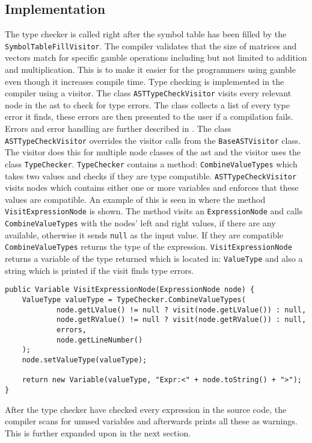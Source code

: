\subsection*{Implementation}
The type checker is called right after the symbol table has been filled by the \texttt{SymbolTableFillVisitor}.
The compiler validates that the size of matrices and vectors match for specific \gls{gamble} operations including but not limited to addition and multiplication.
This is to make it easier for the programmers using \gls{gamble} even though it increases compile time. 
Type checking is implemented in the compiler using a visitor. 
The class \texttt{ASTTypeCheckVisitor} visits every relevant node in the \acrshort{ast} to check for type errors.
The class collects a list of every type error it finds, these errors are then presented to the user if a compilation fails.
Errors and error handling are further described in .
The class \texttt{ASTTypeCheckVisitor} overrides the visitor calls from the \texttt{BaseASTVisitor} class.
The visitor does this for multiple node classes of the \acrshort{ast} and the visitor uses the class \texttt{TypeChecker}.
\texttt{TypeChecker} contains a method: \texttt{CombineValueTypes} which takes two values and checks if they are type compatible.
\texttt{ASTTypeCheckVisitor} visits nodes which contains either one or more variables and enforces that these values are compatible.
An example of this is seen in  where the method \texttt{VisitExpressionNode} is shown.
The method visits an \texttt{ExpressionNode} and calls \texttt{CombineValueTypes} with the nodes' left and right values, if there are any available, otherwise it sends \texttt{null} as the input value. 
If they are compatible \texttt{CombineValueTypes} returns the type of the expression.
\texttt{VisitExpressionNode} returns a variable of the type returned which is located in: \texttt{ValueType} and also a string which is printed if the visit finds type errors.

\begin{lstlisting}[caption=The VisitExprressionNode method in the ASTTypeChecker class,numbers=none,frame=tlrb,label={lst:typecheck1}]
public Variable VisitExpressionNode(ExpressionNode node) {
    ValueType valueType = TypeChecker.CombineValueTypes(
            node.getLValue() != null ? visit(node.getLValue()) : null,
            node.getRValue() != null ? visit(node.getRValue()) : null,
            errors,
            node.getLineNumber()
    );
    node.setValueType(valueType);

    return new Variable(valueType, "Expr:<" + node.toString() + ">");
}
\end{lstlisting}

After the type checker have checked every expression in the source code, the compiler scans for unused variables and afterwards prints all these as warnings.
This is further expanded upon in the next section.
